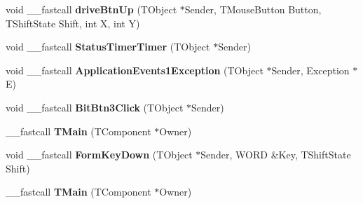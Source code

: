 \begin{DoxyCompactItemize}
\item 
void \+\_\+\+\_\+fastcall {\bfseries drive\+Btn\+Up} (T\+Object $\ast$Sender, T\+Mouse\+Button Button, T\+Shift\+State Shift, int X, int Y)\hypertarget{class_t_main_a8bdef90c5908caf6edc8f95815a63714}{}\label{class_t_main_a8bdef90c5908caf6edc8f95815a63714}

\item 
void \+\_\+\+\_\+fastcall {\bfseries Status\+Timer\+Timer} (T\+Object $\ast$Sender)\hypertarget{class_t_main_acac84432c487bd6e8a30c5990e653063}{}\label{class_t_main_acac84432c487bd6e8a30c5990e653063}

\item 
void \+\_\+\+\_\+fastcall {\bfseries Application\+Events1\+Exception} (T\+Object $\ast$Sender, Exception $\ast$E)\hypertarget{class_t_main_a87df145a052cbb2f36595564f0008ba6}{}\label{class_t_main_a87df145a052cbb2f36595564f0008ba6}

\item 
void \+\_\+\+\_\+fastcall {\bfseries Bit\+Btn3\+Click} (T\+Object $\ast$Sender)\hypertarget{class_t_main_a610890949bf9cbf69cb206b1ef92d7f8}{}\label{class_t_main_a610890949bf9cbf69cb206b1ef92d7f8}

\item 
\+\_\+\+\_\+fastcall {\bfseries T\+Main} (T\+Component $\ast$Owner)\hypertarget{class_t_main_a7b9407ff65dfb1db1922b7575b198091}{}\label{class_t_main_a7b9407ff65dfb1db1922b7575b198091}

\item 
void \+\_\+\+\_\+fastcall {\bfseries Form\+Key\+Down} (T\+Object $\ast$Sender, W\+O\+RD \&Key, T\+Shift\+State Shift)\hypertarget{class_t_main_aea6d7801eb6a6f93bdb1d931837da259}{}\label{class_t_main_aea6d7801eb6a6f93bdb1d931837da259}

\item 
\+\_\+\+\_\+fastcall {\bfseries T\+Main} (T\+Component $\ast$Owner)\hypertarget{class_t_main_a7b9407ff65dfb1db1922b7575b198091}{}\label{class_t_main_a7b9407ff65dfb1db1922b7575b198091}

\end{DoxyCompactItemize}
